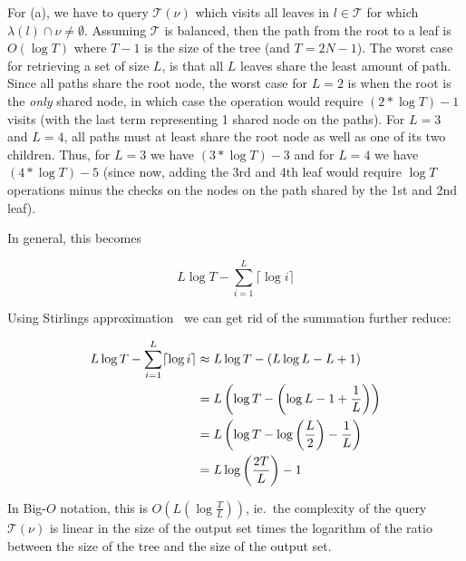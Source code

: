 For (a), we have to query $\mathcal{T}(\nu)$ which visits all leaves in $l \in
\mathcal{T}$ for which $\lambda(l) \cap \nu \neq \emptyset$. Assuming
$\mathcal{T}$ is balanced, then the path from the root to a leaf is $O(\log
 T)$ where $T - 1$ is the size of the tree (and $T = 2N -1$). The worst case
for retrieving a set of size $L$, is that all $L$ leaves share the least amount
of path. Since all paths share the root node, the worst case for $L=2$ is when
the root is the \textit{only} shared node, in which case the operation would
require $(2 * \log T) - 1$ visits (with the last term representing 1 shared
node on the paths). For $L=3$ and $L=4$, all paths must at least share the root
node as well as one of its two children. Thus, for $L=3$ we have $(3 * \log T)
- 3$ and for $L=4$ we have $(4 * \log T) - 5$ (since now, adding the 3rd and
4th leaf would require $\log T$ operations minus the checks on the nodes on the
path shared by the 1st and 2nd leaf).

In general, this becomes 

\begin{equation}\label{eq:runtimeWithCeil}
    L \log T - \sum^{L}_{i=1} \lceil \log i \rceil 
\end{equation}

Using Stirlings approximation~\cite{m.t.l.b.IntroductionProbabilityTheory1951}
we can get rid of the summation further reduce:

\begin{align}
    L \log T - \sum^{L}_{i=1} \lceil \log i \rceil \notag
    &\approx L \log T - (L \log L - L + 1) \notag \\
    &= L \left(
            \log T - \left( \log L - 1 + \frac{1}{L} \right)
         \right) \notag \\
    &= L \left(
            \log T - \log \left( \frac{L}{2} \right) - \frac{1}{L}
         \right) \notag \\
    &= L \log \left( \frac{2T}{L} \right) - 1
\end{align}

In Big-$O$ notation, this is $O(L\left( \log \frac{T}{L} \right))$, ie.\ the
complexity of the query $\mathcal{T}(\nu)$ is linear in the size of the output
set times the logarithm of the ratio between the size of the tree and the size
of the output set.

